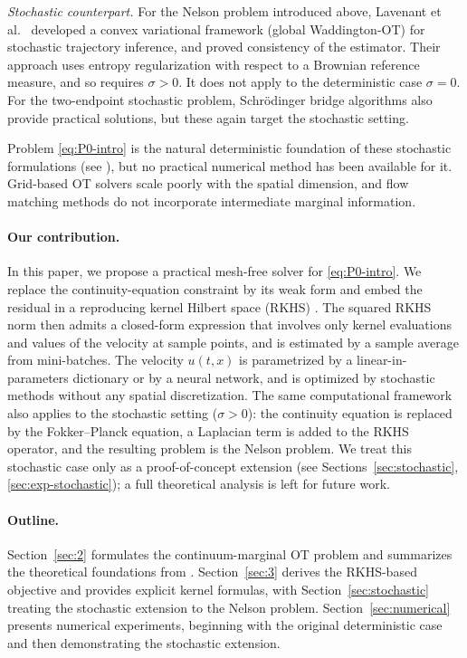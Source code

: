 \documentclass[11pt,leqno]{article}
\theoremstyle{plain}
\theoremstyle{remark}
\theoremstyle{definition}
\numberwithin{equation}{section}
\numberwithin{figure}{section}
\numberwithin{table}{section}
\begin{document}
\emph{Stochastic counterpart.}
For the Nelson problem introduced above, Lavenant et al.\
\cite{lav:2024} developed a convex variational framework (global
Waddington-OT) for stochastic trajectory inference, and proved
consistency of the estimator.
Their approach uses entropy regularization with respect to a Brownian
reference measure, and so requires $\sigma>0$.
It does not apply to the deterministic case $\sigma=0$.
For the two-endpoint stochastic problem, Schr\"odinger bridge
algorithms \cite{DeBortoli2021} also provide practical solutions, but
these again target the stochastic setting.

Problem \eqref{eq:P0-intro} is the natural deterministic foundation of
these stochastic formulations
(see \cite[Theorem~3.7]{Mikami2021}), but no practical numerical method
has been available for it.
Grid-based OT solvers scale poorly with the spatial dimension, and
flow matching methods do not incorporate intermediate marginal
information.

\paragraph{Our contribution.}
In this paper, we propose a practical mesh-free solver for
\eqref{eq:P0-intro}.
We replace the continuity-equation constraint by its weak form and
embed the residual in a reproducing kernel Hilbert space (RKHS)
\cite{Scholkopf2002}.
The squared RKHS norm then admits a closed-form expression that
involves only kernel evaluations and values of the velocity at sample
points, and is estimated by a sample average from mini-batches.
The velocity $u(t,x)$ is parametrized by a linear-in-parameters
dictionary or by a neural network, and is optimized by stochastic
methods without any spatial discretization.
The same computational framework also applies to the stochastic
setting ($\sigma>0$): the continuity equation is replaced by the
Fokker--Planck equation, a Laplacian term is added to the RKHS
operator, and the resulting problem is the Nelson problem.  We treat
this stochastic case only as a proof-of-concept extension (see
Sections~\ref{sec:stochastic}, \ref{sec:exp-stochastic}); a full
theoretical analysis is left for future work.

\paragraph{Outline.}
Section~\ref{sec:2} formulates the continuum-marginal OT problem and
summarizes the theoretical foundations from \cite{Mikami2021}.
Section~\ref{sec:3} derives the RKHS-based objective and provides explicit
kernel formulas, with Section~\ref{sec:stochastic} treating the
stochastic extension to the Nelson problem.
Section~\ref{sec:numerical} presents numerical experiments, beginning with
the original deterministic case and then demonstrating the stochastic
extension.
\end{document}
